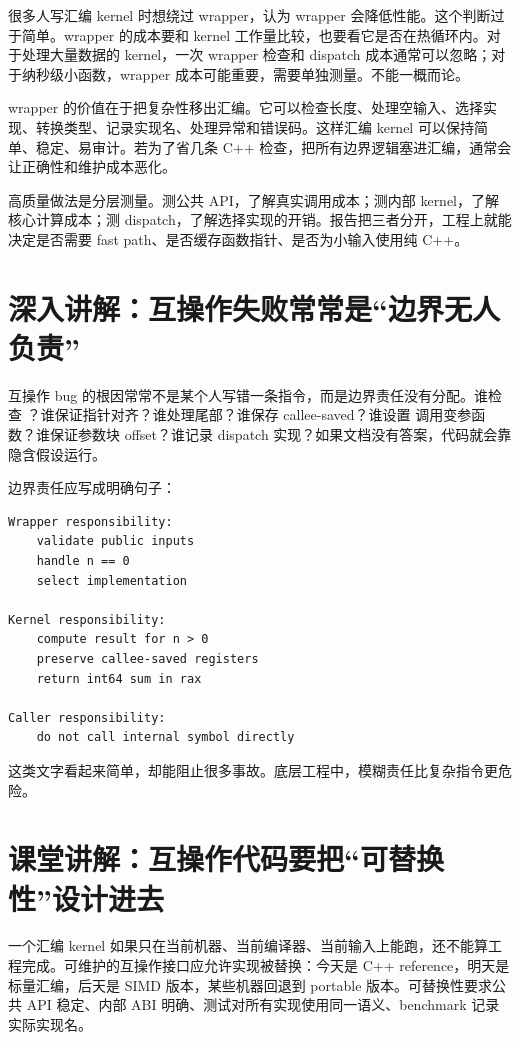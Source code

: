 很多人写汇编 kernel 时想绕过 wrapper，认为 wrapper 会降低性能。这个判断过于简单。wrapper 的成本要和 kernel 工作量比较，也要看它是否在热循环内。对于处理大量数据的 kernel，一次 wrapper 检查和 dispatch 成本通常可以忽略；对于纳秒级小函数，wrapper 成本可能重要，需要单独测量。不能一概而论。

wrapper 的价值在于把复杂性移出汇编。它可以检查长度、处理空输入、选择实现、转换类型、记录实现名、处理异常和错误码。这样汇编 kernel 可以保持简单、稳定、易审计。若为了省几条 C++ 检查，把所有边界逻辑塞进汇编，通常会让正确性和维护成本恶化。

高质量做法是分层测量。测公共 API，了解真实调用成本；测内部 kernel，了解核心计算成本；测 dispatch，了解选择实现的开销。报告把三者分开，工程上就能决定是否需要 fast path、是否缓存函数指针、是否为小输入使用纯 C++。

\section{深入讲解：互操作失败常常是“边界无人负责”}

互操作 bug 的根因常常不是某个人写错一条指令，而是边界责任没有分配。谁检查 ？谁保证指针对齐？谁处理尾部？谁保存 callee-saved？谁设置  调用变参函数？谁保证参数块 offset？谁记录 dispatch 实现？如果文档没有答案，代码就会靠隐含假设运行。

边界责任应写成明确句子：

\begin{lstlisting}
Wrapper responsibility:
    validate public inputs
    handle n == 0
    select implementation

Kernel responsibility:
    compute result for n > 0
    preserve callee-saved registers
    return int64 sum in rax

Caller responsibility:
    do not call internal symbol directly
\end{lstlisting}

这类文字看起来简单，却能阻止很多事故。底层工程中，模糊责任比复杂指令更危险。

\section{课堂讲解：互操作代码要把“可替换性”设计进去}

一个汇编 kernel 如果只在当前机器、当前编译器、当前输入上能跑，还不能算工程完成。可维护的互操作接口应允许实现被替换：今天是 C++ reference，明天是标量汇编，后天是 SIMD 版本，某些机器回退到 portable 版本。可替换性要求公共 API 稳定、内部 ABI 明确、测试对所有实现使用同一语义、benchmark 记录实际实现名。

